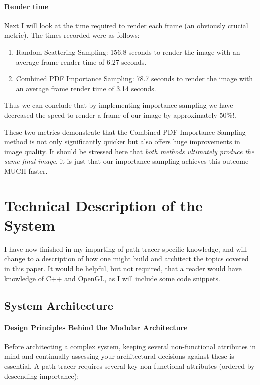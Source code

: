 \documentclass[12pt]{article}
\begin{document}
\paragraph{Render time} Next I will look at the time required to render each frame (an obviously crucial metric). The times recorded were as follows:
\begin{enumerate}
    \item Random Scattering Sampling:
          156.8 seconds to render the image with an average frame render time of 6.27 seconds.

    \item Combined PDF Importance Sampling:
          78.7 seconds to render the image with an average frame render time of 3.14 seconds.
\end{enumerate}

Thus we can conclude that by implementing importance sampling we have decreased the speed to render a frame of our image by approximately 50\%!.

These two metrics demonstrate that the Combined PDF Importance Sampling method is not only significantly quicker but also offers huge improvements in image quality.
It should be stressed here that \textit{both methods ultimately produce the same final image}, it is just that our importance sampling achieves this outcome MUCH faster.

\pagebreak
\section{Technical Description of the System}
\label{sec:system-description}

I have now finished in my imparting of path-tracer specific knowledge, and will change to a description of how one might build and architect the topics covered in this paper. It would be helpful, but not required, that a reader would have knowledge of C++ and OpenGL, as I will include some code snippets.

\subsection{System Architecture}

\paragraph{Design Principles Behind the Modular Architecture} Before architecting a complex system, keeping several non-functional attributes in mind and continually assessing your architectural decisions against these is essential.
A path tracer requires several key non-functional attributes (ordered by descending importance):
\end{document}
